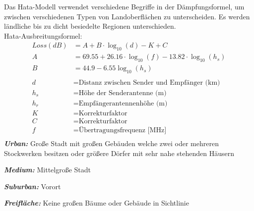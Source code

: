 \documentclass[12pt,a4paper]{article}
\begin{document}
Das Hata-Modell verwendet verschiedene Begriffe in der Dämpfungsformel, um zwischen verschiedenen Typen von Landoberflächen zu unterscheiden. Es werden ländliche bis zu dicht besiedelte Regionen unterschieden.\\

Hata-Ausbreitungsformel:\\

\begin{align*}
Loss(dB) &= A + B \cdot \log_{10}{(d)} - K + C \\ 
A &= 69.55 + 26.16 \cdot \log_{10}{(f)} - 13.82 \cdot \log_{10}{(h_s)} \\
B &= 44.9 - 6.55 \log_{10}{(h_s)} \\ \\
d &= \text{Distanz zwischen Sender und Empfänger (km)} \\
h_s &= \text{Höhe der Senderantenne (m)} \\
h_r &= \text{Empfängerantennenhöhe (m)} \\
K &= \text{Korrekturfaktor} \\
C &= \text{Korrekturfaktor}\\
f &= \text{Übertragungsfrequenz  [MHz]} \\
\end{align*} 
\newpage
\textbf{\emph{Urban:  }}Große Stadt mit großen Gebäuden welche zwei oder mehreren Stockwerken besitzen oder größere Dörfer mit sehr nahe stehenden Häusern

\textbf{\emph{Medium:  }}  Mittelgroße Stadt

\textbf{\emph{Suburban:  }} Vorort

\textbf{\emph{Freifläche:  }} Keine großen Bäume oder Gebäude in Sichtlinie
\end{document}
